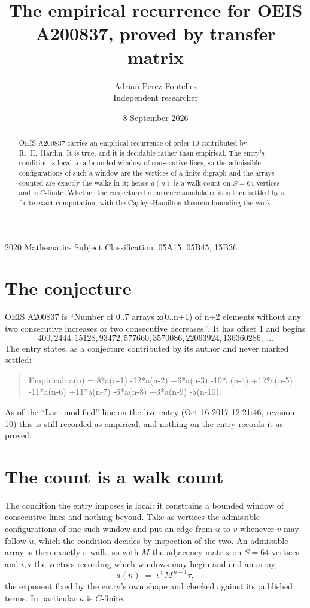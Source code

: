 \documentclass[11pt,a4paper]{article}
\title{The empirical recurrence for OEIS A200837, proved by transfer matrix}
\author{Adrian Perez Fontelles\\ \small Independent researcher}
\date{8 September 2026}
\theoremstyle{plain}
\theoremstyle{definition}
\begin{document}
\maketitle

\begin{abstract}
OEIS A200837 carries an empirical recurrence of order $10$ contributed by R.~H.~Hardin. It is
true, and it is decidable rather than empirical. The entry's condition is local to a bounded window of consecutive lines, so
the admissible configurations of such a window are the vertices of a finite digraph and the
arrays counted are exactly the walks in it; hence $a(n)$ is a walk count on $S=64$ vertices
and is $C$-finite. Whether the conjectured recurrence annihilates it is then settled by a
finite exact computation, with the Cayley--Hamilton theorem bounding the work.
\end{abstract}

\noindent\small 2020 Mathematics Subject Classification. 05A15, 05B45, 15B36.\normalsize

\section{The conjecture}

OEIS A200837 is ``Number of 0..7 arrays x(0..n+1) of n+2 elements without any two consecutive increases or two consecutive decreases.''. It has offset $1$ and begins
\[
400, 2444, 15128, 93472, 577660, 3570086, 22063924, 136360286,\ \dots
\]
The entry states, as a conjecture contributed by its author and never marked settled:
\begin{quote}
Empirical: a(n) = 8*a(n-1) -12*a(n-2) +6*a(n-3) -10*a(n-4) +12*a(n-5) -11*a(n-6) +11*a(n-7) -6*a(n-8) +3*a(n-9) -a(n-10).
\end{quote}
As of the ``Last modified'' line on the live entry (Oct 16 2017 12:21:46, revision 10) this is still
recorded as empirical, and nothing on the entry records it as proved.

\section{The count is a walk count}

The condition the entry imposes is local: it constrains a bounded window of consecutive lines and nothing beyond. Take as
vertices the admissible configurations of one such window and put an edge from $u$ to $v$
whenever $v$ may follow $u$, which the condition decides by inspection of the two. An
admissible array is then exactly a walk, so with $M$ the adjacency matrix on $S=64$ vertices
and $\iota,\tau$ the vectors recording which windows may begin and end an array,
\[
a(n)\;=\;\iota^{\!\top}M^{\,n-1}\tau ,
\]
the exponent fixed by the entry's own shape and checked against its published terms. In
particular $a$ is $C$-finite.
\end{document}
